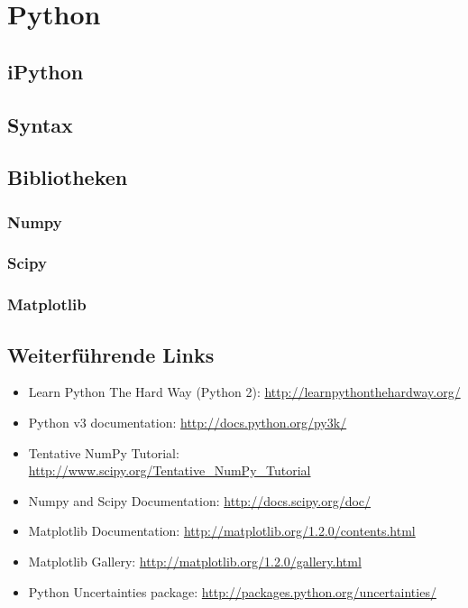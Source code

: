 \chapter{Python}
\section{iPython}
\section{Syntax}
\section{Bibliotheken}
\subsection{Numpy}
\subsection{Scipy}
\subsection{Matplotlib}

\section{Weiterführende Links}
\begin{itemize}
  \item Learn Python The Hard Way (Python 2): \href{http://learnpythonthehardway.org/}{http://learnpythonthehardway.org/}
  \item Python v3 documentation: \href{http://docs.python.org/py3k/}{http://docs.python.org/py3k/}
  \item Tentative NumPy Tutorial: \href{http://www.scipy.org/Tentative\_NumPy\_Tutorial}{http://www.scipy.org/Tentative\_NumPy\_Tutorial}
  \item Numpy and Scipy Documentation: \href{http://docs.scipy.org/doc/}{http://docs.scipy.org/doc/}
  \item Matplotlib Documentation: \href{http://matplotlib.org/1.2.0/contents.html}{http://matplotlib.org/1.2.0/contents.html}
  \item Matplotlib Gallery: \href{http://matplotlib.org/1.2.0/gallery.html}{http://matplotlib.org/1.2.0/gallery.html}
  \item Python Uncertainties package: \href{http://packages.python.org/uncertainties/}{http://packages.python.org/uncertainties/}
\end{itemize}

